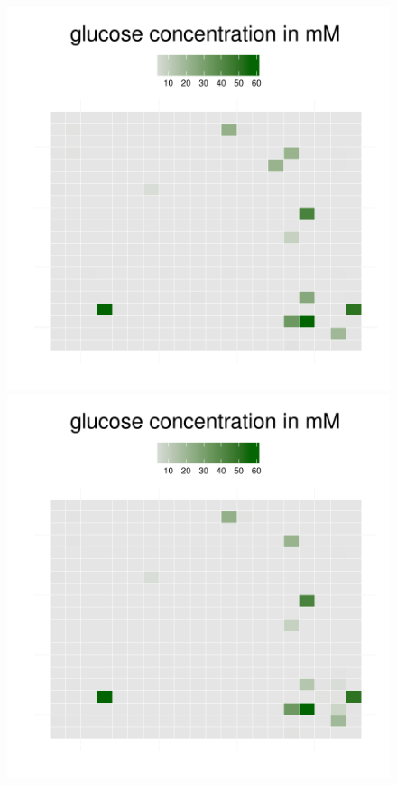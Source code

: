\begin{figure}[h]
{\begin{minipage}[t]{0.3\textwidth}
  \end{minipage}
  \begin{minipage}[t]{0.3\textwidth}
    \includegraphics[width=\textwidth]{../results/barkeri_beijerinckii_20x20_seed6764_gluc100.pdf}
  \end{minipage}
  \begin{minipage}[t]{0.3\textwidth}
    \includegraphics[width=\textwidth]{../results/barkeri_beijerinckii_20x20_seed6764_gluc150.pdf}

\end{minipage}}
\end{figure}
